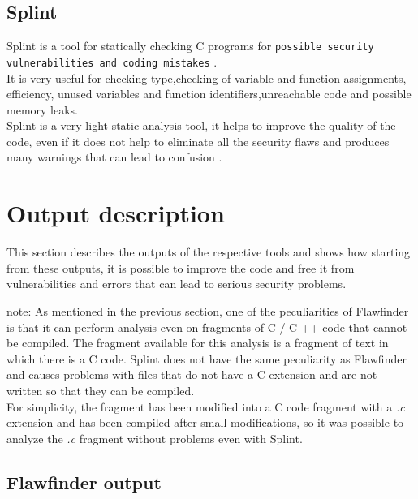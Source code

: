 \documentclass[a4paper,12pt]{article}
\newenvironment{SpecialPar}
  {\begin{shaded}}
  {\end{shaded}}
\begin{document}
\subsection{Splint}
Splint is a tool for statically checking C programs for \texttt{possible security vulnerabilities and coding mistakes} \cite{splint}.\\
It is very useful for checking type,checking of variable and function assignments, efficiency, unused variables and function identifiers,unreachable code and possible memory leaks.\\
Splint is a very light static analysis tool, it helps to improve the quality of the code, even if it does not help to eliminate all the security flaws and produces many warnings that can lead to confusion \cite{splint2}.



\newpage
\section{Output description}
This section describes the outputs of the respective tools and shows how starting from these outputs, it is possible to improve the code and free it from vulnerabilities and errors that can lead to serious security problems.
\begin{SpecialPar}
\noindent
note: As mentioned in the previous section, one of the peculiarities of Flawfinder is that it can perform analysis even on fragments of C / C ++ code that cannot be compiled.
The fragment available for this analysis is a fragment of text in which there is a C code.
Splint does not have the same peculiarity as Flawfinder and causes problems with files that do not have a C extension and are not written so that they can be compiled.\\
For simplicity, the fragment has been modified into a C code fragment with a \textit{.c} extension and has been compiled after small modifications, so it was possible to analyze the \textit{.c} fragment without problems even with Splint.
\end{SpecialPar}




\subsection{Flawfinder output}
\end{document}
